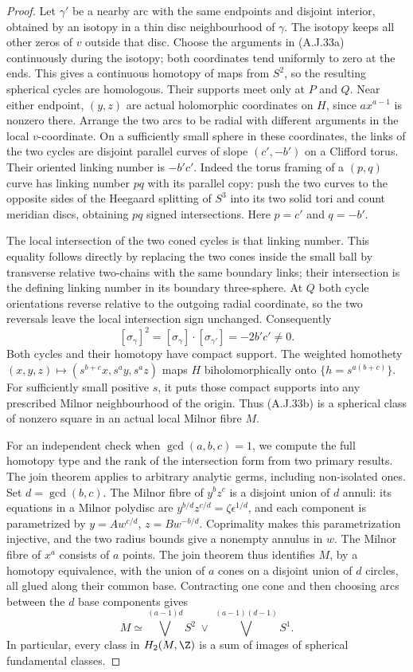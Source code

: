 \begin{proof}
Let $\gamma'$ be a nearby arc with the same endpoints
and disjoint interior, obtained by an isotopy in a
thin disc neighbourhood of $\gamma$. The isotopy
keeps all other zeros of $v$ outside that disc.
Choose the arguments in (A.J.33a) continuously during
the isotopy; both coordinates tend uniformly to zero
at the ends. This gives a continuous homotopy of
maps from $S^2$, so the resulting spherical cycles
are homologous. Their supports meet only at $P$ and
$Q$. Near either endpoint, $(y,z)$ are actual
holomorphic coordinates on $H$, since $a x^{a-1}$
is nonzero there. Arrange the two arcs to be radial
with different arguments in the local $v$-coordinate.
On a sufficiently small sphere in these coordinates,
the links of the two cycles are disjoint parallel
curves of slope $(c',-b')$ on a Clifford torus.
Their oriented linking number is $-b'c'$.
Indeed the torus framing of a $(p,q)$ curve has
linking number $pq$ with its parallel copy: push the
two curves to the opposite sides of the Heegaard
splitting of $S^3$ into its two solid tori and count
meridian discs, obtaining $p q$ signed intersections.
Here $p=c'$ and $q=-b'$.

The local intersection of the two coned cycles is
that linking number. This equality follows directly
by replacing the two cones inside the small ball by
transverse relative two-chains with the same boundary
links; their intersection is the defining linking
number in its boundary three-sphere. At $Q$ both
cycle orientations reverse relative to the outgoing
radial coordinate, so the two reversals leave the
local intersection sign unchanged. Consequently
\[
 [\sigma_\gamma]^2
   =[\sigma_\gamma]\cdot[\sigma_{\gamma'}]
   =-2b'c'\ne0.                                  \tag{A.J.33b}
\]
Both cycles and their homotopy have compact support.
The weighted homothety
$(x,y,z)\mapsto(s^{b+c}x,s^a y,s^a z)$ maps
$H$ biholomorphically onto $\{h=s^{a(b+c)}\}$.
For sufficiently small positive $s$, it puts those
compact supports into any prescribed Milnor
neighbourhood of the origin. Thus (A.J.33b) is a
spherical class of nonzero square in an actual
local Milnor fibre $M$.

For an independent check when $\gcd(a,b,c)=1$,
we compute the full homotopy type and the rank of
the intersection form from two primary results.
The join theorem
\cite[Theorem L1 and Example 2.4(a)]{Nemethi1991Join}
applies to arbitrary analytic germs, including
non-isolated ones. Set $d=\gcd(b,c)$. The Milnor
fibre of $y^bz^c$ is a disjoint union of $d$ annuli:
its equations in a Milnor polydisc are
$y^{b/d}z^{c/d}=\zeta\epsilon^{1/d}$, and each
component is parametrized by
$y=A w^{c/d}$, $z=B w^{-b/d}$. Coprimality makes
this parametrization injective, and the two radius
bounds give a nonempty annulus in $w$.
The Milnor fibre of $x^a$ consists of $a$ points.
The join theorem thus identifies $M$, by a homotopy
equivalence, with the union of $a$ cones on a
disjoint union of $d$ circles, all glued along their
common base. Contracting one cone and then choosing
arcs between the $d$ base components gives
\[
 M\simeq
 \bigvee^{(a-1)d}S^2\ \vee\
 \bigvee^{(a-1)(d-1)}S^1.                          \tag{A.J.35}
\]
In particular, every class in $H_2(M,\Z)$ is a sum
of images of spherical fundamental classes.


\end{proof}
